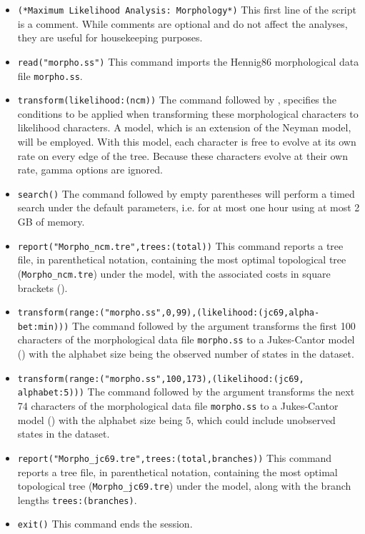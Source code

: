 \begin{itemize}
\item \texttt{(*Maximum Likelihood Analysis: Morphology*)} This first line of the script is a comment. 
While comments are optional and do not affect the analyses, they are useful for housekeeping purposes.
\item \texttt{read("morpho.ss")} This command imports the Hennig86 morphological data file \texttt{morpho.ss}. 
\item \texttt{transform(likelihood:(ncm))} The  command followed by 
, specifies the conditions to be applied when transforming these morphological characters 
to likelihood characters. A  model, which is an extension of the Neyman model, will be employed.
With this model, each character is free to evolve at its own rate on every edge of the tree. Because these characters 
evolve at their own rate, gamma options are ignored.
\item \texttt{search()} The  command followed by empty parentheses will perform a timed 
search under the default parameters, i.e. for at most one hour using at most 2 GB of memory.
\item \texttt{report("Morpho\_ncm.tre",trees:(total))} This command reports a tree file, in parenthetical
notation,  containing the most optimal topological tree (\texttt{Morpho\_ncm.tre}) under the  model,
 with the associated costs in square brackets ().  
\item \texttt{transform(range:("morpho.ss",0,99),(likelihood:(jc69,alpha-\\bet:min)))} The 
command followed by the  argument transforms the first 100 characters of the morphological 
data file \texttt{morpho.ss} to a Jukes-Cantor model () with the alphabet size being the observed
number of states in the dataset.
\item \texttt{transform(range:("morpho.ss",100,173),(likelihood:(jc69,\\alphabet:5)))} The 
command followed by the  argument transforms the next 74 characters of the morphological 
data file \texttt{morpho.ss} to a Jukes-Cantor model () with the alphabet size being $5$, which could 
include unobserved states in the dataset.
\item \texttt{report("Morpho\_jc69.tre",trees:(total,branches))} This command reports a tree file, in parenthetical
notation, containing the most optimal topological tree (\texttt{Morpho\_jc69.tre}) under the  model,
along with the branch lengths \texttt{trees:(branches)}.  
\item \texttt{exit()} This command ends the \poy session.
\end{itemize}

